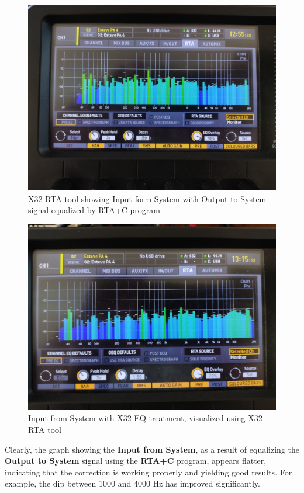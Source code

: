 \begin{figure}[H]
	\centering
	\includegraphics[width=0.8
	\linewidth]{Figures/Coro_X32_treatedRTAc.jpeg}
	\caption[X32 RTA tool with EQ enabled]{X32 RTA tool showing Input form System with Output to System signal equalized by RTA+C program}
	\label{fig:Coro_X32_RTA+C}
\end{figure}

\begin{figure}[H]
	\centering
	\includegraphics[width=0.8
	\linewidth]{Figures/Coro_X32_treatedX32.jpeg}
	\caption{Input from System with X32 EQ treatment, visualized using X32 RTA tool}
	\label{fig:Coro_X32_treatedX32}
\end{figure}

Clearly, the graph showing the \textbf{Input from System}, as a result of equalizing the \textbf{Output to System} signal using the \textbf{RTA+C} program, appears flatter, indicating that the correction is working properly and yielding good results. For example, the dip between 1000 and 4000 Hz has improved significantly.

